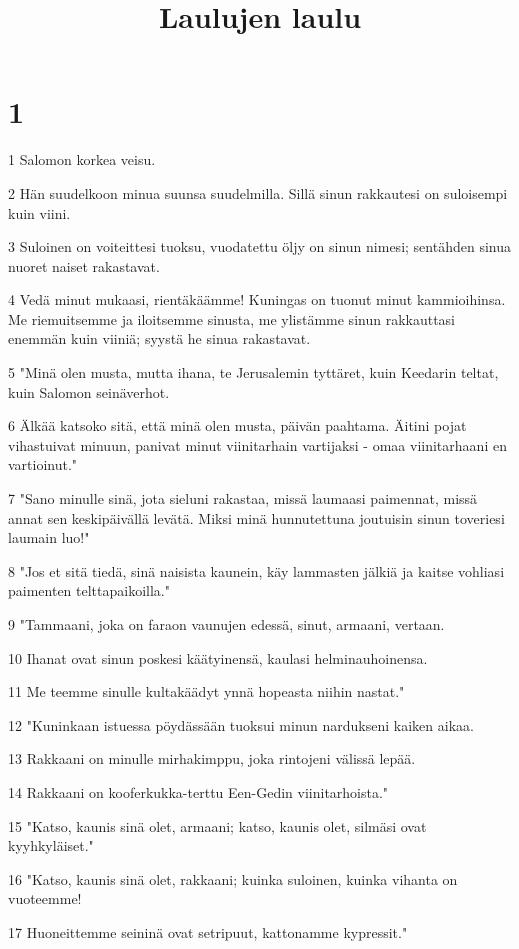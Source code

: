 

\title{Laulujen laulu}


\chapter{1}

\par 1 Salomon korkea veisu.
\par 2 Hän suudelkoon minua suunsa suudelmilla. Sillä sinun rakkautesi on suloisempi kuin viini.
\par 3 Suloinen on voiteittesi tuoksu, vuodatettu öljy on sinun nimesi; sentähden sinua nuoret naiset rakastavat.
\par 4 Vedä minut mukaasi, rientäkäämme! Kuningas on tuonut minut kammioihinsa. Me riemuitsemme ja iloitsemme sinusta, me ylistämme sinun rakkauttasi enemmän kuin viiniä; syystä he sinua rakastavat.
\par 5 "Minä olen musta, mutta ihana, te Jerusalemin tyttäret, kuin Keedarin teltat, kuin Salomon seinäverhot.
\par 6 Älkää katsoko sitä, että minä olen musta, päivän paahtama. Äitini pojat vihastuivat minuun, panivat minut viinitarhain vartijaksi - omaa viinitarhaani en vartioinut."
\par 7 "Sano minulle sinä, jota sieluni rakastaa, missä laumaasi paimennat, missä annat sen keskipäivällä levätä. Miksi minä hunnutettuna joutuisin sinun toveriesi laumain luo!"
\par 8 "Jos et sitä tiedä, sinä naisista kaunein, käy lammasten jälkiä ja kaitse vohliasi paimenten telttapaikoilla."
\par 9 "Tammaani, joka on faraon vaunujen edessä, sinut, armaani, vertaan.
\par 10 Ihanat ovat sinun poskesi käätyinensä, kaulasi helminauhoinensa.
\par 11 Me teemme sinulle kultakäädyt ynnä hopeasta niihin nastat."
\par 12 "Kuninkaan istuessa pöydässään tuoksui minun nardukseni kaiken aikaa.
\par 13 Rakkaani on minulle mirhakimppu, joka rintojeni välissä lepää.
\par 14 Rakkaani on kooferkukka-terttu Een-Gedin viinitarhoista."
\par 15 "Katso, kaunis sinä olet, armaani; katso, kaunis olet, silmäsi ovat kyyhkyläiset."
\par 16 "Katso, kaunis sinä olet, rakkaani; kuinka suloinen, kuinka vihanta on vuoteemme!
\par 17 Huoneittemme seininä ovat setripuut, kattonamme kypressit."

